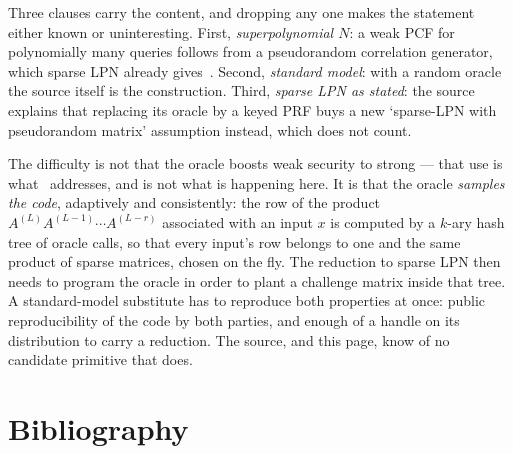 \documentclass{aicr-conjecture}
\begin{document}
\begin{remark}
Three clauses carry the content, and dropping any one makes the
statement either known or uninteresting. First,
\emph{superpolynomial $N$}: a
weak PCF for polynomially many queries follows from a pseudorandom
correlation generator, which sparse LPN already gives~\cite{BCGI18}.
Second, \emph{standard model}: with a random oracle the source itself
is the construction. Third,
\emph{sparse LPN as stated}: the source explains that
replacing its oracle by a keyed PRF buys a new `sparse-LPN with
pseudorandom matrix' assumption instead, which does not count.
\end{remark}

\begin{remark}
The difficulty is not that the oracle boosts weak security to strong ---
that use is what~\cite{BCEKM24} addresses, and is not what is happening
here. It is that the oracle \emph{samples the code}, adaptively and
consistently: the row of the product
$A^{(L)} A^{(L-1)} \cdots A^{(L-r)}$ associated with an input $x$ is
computed by a $k$-ary hash tree of oracle calls, so that every input's
row belongs to one and the same product of sparse matrices, chosen on
the fly. The reduction to sparse LPN then needs to program the oracle in
order to plant a challenge matrix inside that tree. A standard-model
substitute has to reproduce both properties at once: public
reproducibility of the code by both parties, and enough of a handle on
its distribution to carry a reduction. The source, and this page, know
of no candidate primitive that does.
\end{remark}

\section{Bibliography}
\end{document}

